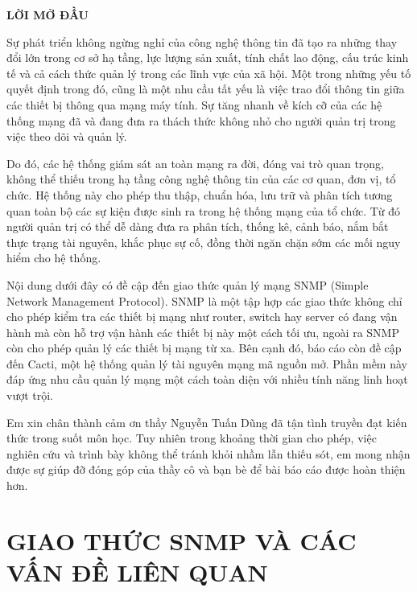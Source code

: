 \documentclass[12pt,oneside,a4paper,reqno]{report}
\begin{document}
\begin{large}
\newpage
\tableofcontents
\newpage
	

\newpage
\vspace*{0.2cm}
\centerline{\Large\bf LỜI MỞ ĐẦU}
\vspace*{0.5cm}

Sự phát triển không ngừng nghỉ của công nghệ thông tin đã tạo ra những thay đổi lớn trong cơ sở hạ tầng, lực lượng sản xuất, tính chất lao động, cấu trúc kinh tế và cả cách thức quản lý trong các lĩnh vực của xã hội. Một trong những yếu tố quyết định trong đó, cũng là một nhu cầu tất yếu là việc trao đổi thông tin giữa các thiết bị thông qua mạng máy tính. Sự tăng nhanh về kích cỡ của các hệ thống mạng đã và đang đưa ra thách thức không nhỏ cho người quản trị trong việc theo dõi và quản lý.

Do đó, các hệ thống giám sát an toàn mạng ra đời, đóng vai trò quan trọng, không thể thiếu trong hạ tầng công nghệ thông tin của các cơ quan, đơn vị, tổ chức. Hệ thống này cho phép thu thập, chuẩn hóa, lưu trữ và phân tích tương quan toàn bộ các sự kiện được sinh ra trong hệ thống mạng của tổ chức. Từ đó người quản trị có thể dễ dàng đưa ra phân tích, thống kê, cảnh báo, nắm bắt thực trạng tài nguyên, khắc phục sự cố, đồng thời ngăn chặn sớm các mối nguy hiểm cho hệ thống.

Nội dung dưới đây có đề cập đến giao thức quản lý mạng SNMP (Simple Network Management Protocol). SNMP là một tập hợp các giao thức không chỉ cho phép kiểm tra các thiết bị mạng như router, switch hay server có đang vận hành mà còn hỗ trợ vận hành các thiết bị này một cách tối ưu, ngoài ra SNMP còn cho phép quản lý các thiết bị mạng từ xa. Bên cạnh đó, báo cáo còn đề cập đến Cacti, một hệ thống quản lý tài nguyên mạng mã nguồn mở. Phần mềm này đáp ứng nhu cầu quản lý mạng một cách toàn diện với nhiều tính năng linh hoạt vượt trội.

Em xin chân thành cảm ơn thầy Nguyễn Tuấn Dũng đã tận tình truyền đạt kiến thức trong suốt môn học. Tuy nhiên trong khoảng thời gian cho phép, việc nghiên cứu và trình bày không thể tránh khỏi nhầm lẫn thiếu sót, em mong nhận được sự giúp đỡ đóng góp của thầy cô và bạn bè để bài báo cáo được hoàn thiện hơn.



\chapter{GIAO THỨC SNMP VÀ CÁC VẤN ĐỀ LIÊN QUAN}

\end{large}
\end{document}

